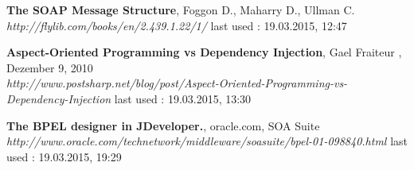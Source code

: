 \documentclass[12pt]{article}
\begin{document}
\begin{thebibliography}{56}
  \textbf{The SOAP Message Structure},  Foggon D.,  Maharry D.,  Ullman C.\\
  \textit{http://flylib.com/books/en/2.439.1.22/1/}
  \newline last used : 19.03.2015, 12:47



  \textbf{Aspect-Oriented Programming vs Dependency Injection}, Gael Fraiteur , Dezember 9, 2010\\
  \textit{http://www.postsharp.net/blog/post/Aspect-Oriented-Programming-vs-Dependency-Injection}
  \newline last used : 19.03.2015, 13:30

 	 
 	 

  \textbf{The BPEL designer in JDeveloper.}, oracle.com, SOA Suite\\
  \textit{http://www.oracle.com/technetwork/middleware/soasuite/bpel-01-098840.html}
  \newline last used : 19.03.2015, 19:29
 	 
\end{thebibliography}
\end{document}
